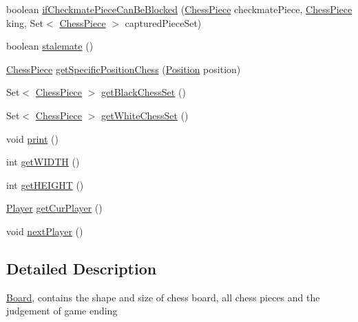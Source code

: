 \begin{DoxyCompactItemize}
\item 
boolean \mbox{\hyperlink{classchess_1_1models_1_1_board_a59a36d62ed2b4ef22b14fda1c10968d8}{if\+Checkmate\+Piece\+Can\+Be\+Blocked}} (\mbox{\hyperlink{classchess_1_1models_1_1_chess_piece}{Chess\+Piece}} checkmate\+Piece, \mbox{\hyperlink{classchess_1_1models_1_1_chess_piece}{Chess\+Piece}} king, Set$<$ \mbox{\hyperlink{classchess_1_1models_1_1_chess_piece}{Chess\+Piece}} $>$ captured\+Piece\+Set)
\item 
boolean \mbox{\hyperlink{classchess_1_1models_1_1_board_aca772c3b56248d6e3fbf97d00a9abaf9}{stalemate}} ()
\item 
\mbox{\hyperlink{classchess_1_1models_1_1_chess_piece}{Chess\+Piece}} \mbox{\hyperlink{classchess_1_1models_1_1_board_a3e21ecd167f3c80dfd260e9acde208c6}{get\+Specific\+Position\+Chess}} (\mbox{\hyperlink{classchess_1_1models_1_1_position}{Position}} position)
\item 
Set$<$ \mbox{\hyperlink{classchess_1_1models_1_1_chess_piece}{Chess\+Piece}} $>$ \mbox{\hyperlink{classchess_1_1models_1_1_board_a4dcc35426fd6ebe9725b2edaa4752310}{get\+Black\+Chess\+Set}} ()
\item 
Set$<$ \mbox{\hyperlink{classchess_1_1models_1_1_chess_piece}{Chess\+Piece}} $>$ \mbox{\hyperlink{classchess_1_1models_1_1_board_a0fab147b0205caf586306a03e758e7bb}{get\+White\+Chess\+Set}} ()
\item 
void \mbox{\hyperlink{classchess_1_1models_1_1_board_af22da20d051a6cc31c6730e5dc80d81e}{print}} ()
\item 
int \mbox{\hyperlink{classchess_1_1models_1_1_board_aeab935c6befad60e51084a78458ebf39}{get\+W\+I\+D\+TH}} ()
\item 
int \mbox{\hyperlink{classchess_1_1models_1_1_board_a28a3d4b9d0738a26666b7c97394242a9}{get\+H\+E\+I\+G\+HT}} ()
\item 
\mbox{\hyperlink{enumchess_1_1models_1_1enums_1_1_player}{Player}} \mbox{\hyperlink{classchess_1_1models_1_1_board_aa4ce59757096d83c1f8ffe3d97b84190}{get\+Cur\+Player}} ()
\item 
void \mbox{\hyperlink{classchess_1_1models_1_1_board_a1ec14777a87bc322201a01609e4d6d2f}{next\+Player}} ()
\end{DoxyCompactItemize}


\subsection{Detailed Description}
\mbox{\hyperlink{classchess_1_1models_1_1_board}{Board}}, contains the shape and size of chess board, all chess pieces and the judgement of game ending 

